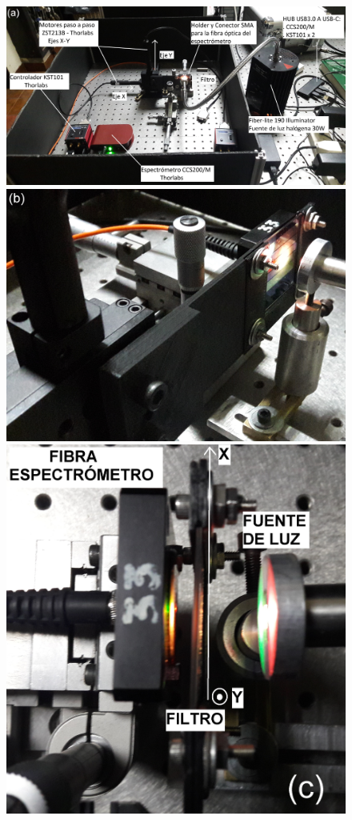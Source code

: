 \begin{figure}[H]
\includegraphics[width=1.0\textwidth]{Figs/microespectrometro/setupbarridooriginal.jpg}
\hfill%
\includegraphics[scale=0.073]{Figs/microespectrometro/montajesetup0.jpg}
\hfill%
\includegraphics[scale=0.073]{Figs/microespectrometro/5.jpg}

\end{figure}
